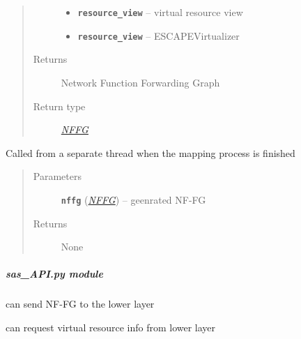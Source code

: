 \documentclass[letterpaper,10pt,english]{sphinxmanual}
\begin{document}
\begin{fulllineitems}
\begin{fulllineitems}
\begin{quote}
\begin{description}
\begin{itemize}
\item {} 
\textbf{\texttt{resource\_view}} -- virtual resource view

\item {} 
\textbf{\texttt{resource\_view}} -- ESCAPEVirtualizer

\end{itemize}

\item[{Returns}] \leavevmode
Network Function Forwarding Graph

\item[{Return type}] \leavevmode
{\hyperref[util/nffg:escape.util.nffg.NFFG]{\emph{NFFG}}}

\end{description}\end{quote}

\end{fulllineitems}


\begin{fulllineitems}
\label{service/sas_mapping:escape.service.sas_mapping.ServiceGraphMapper._mapping_finished}
Called from a separate thread when the mapping process is finished
\begin{quote}\begin{description}
\item[{Parameters}] \leavevmode
\textbf{\texttt{nffg}} ({\hyperref[util/nffg:escape.util.nffg.NFFG]{\emph{\emph{NFFG}}}}) -- geenrated NF-FG

\item[{Returns}] \leavevmode
None

\end{description}\end{quote}

\end{fulllineitems}


\end{fulllineitems}



\subparagraph{\emph{sas\_API.py} module}
\label{service/sas_API:sas-api-py-module}\label{service/sas_API::doc}
{\hyperref[service/sas_API:escape.service.sas_API.InstantiateNFFGEvent]{\emph{}}} can send NF-FG to the lower layer

{\hyperref[service/sas_API:escape.service.sas_API.GetVirtResInfoEvent]{\emph{}}} can request virtual resource info from lower layer
\end{document}
